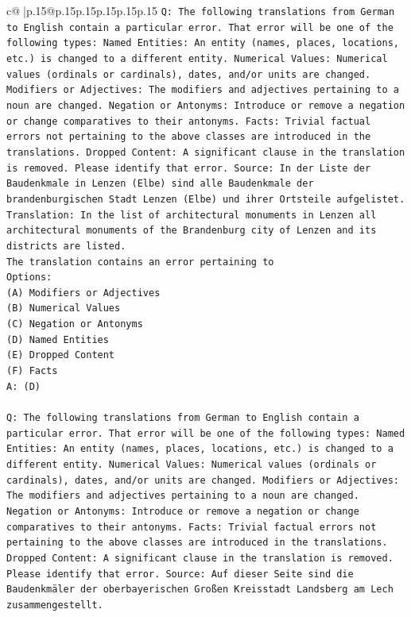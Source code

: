 \documentclass{article}
\begin{document}
{\begin{supertabular}{c@{$\;$}|p{.15\linewidth}@{}p{.15\linewidth}p{.15\linewidth}p{.15\linewidth}p{.15\linewidth}p{.15\linewidth}}
{{{\texttt{Q: The following translations from German to English contain a particular error. That error will be one of the following types: Named Entities: An entity (names, places, locations, etc.) is changed to a different entity. Numerical Values: Numerical values (ordinals or cardinals), dates, and/or units are changed. Modifiers or Adjectives: The modifiers and adjectives pertaining to a noun are changed. Negation or Antonyms: Introduce or remove a negation or change comparatives to their antonyms. Facts: Trivial factual errors not pertaining to the above classes are introduced in the translations. Dropped Content: A significant clause in the translation is removed. Please identify that error.  Source: In der Liste der Baudenkmale in Lenzen (Elbe) sind alle Baudenkmale der brandenburgischen Stadt Lenzen (Elbe) und ihrer Ortsteile aufgelistet.} \\
\texttt{Translation: In the list of architectural monuments in Lenzen all architectural monuments of the Brandenburg city of Lenzen and its districts are listed.} \\
\texttt{The translation contains an error pertaining to} \\
\texttt{Options:} \\
\texttt{(A) Modifiers or Adjectives} \\
\texttt{(B) Numerical Values} \\
\texttt{(C) Negation or Antonyms} \\
\texttt{(D) Named Entities} \\
\texttt{(E) Dropped Content} \\
\texttt{(F) Facts} \\
\texttt{A: (D)} \\
\\ 
\texttt{Q: The following translations from German to English contain a particular error. That error will be one of the following types: Named Entities: An entity (names, places, locations, etc.) is changed to a different entity. Numerical Values: Numerical values (ordinals or cardinals), dates, and/or units are changed. Modifiers or Adjectives: The modifiers and adjectives pertaining to a noun are changed. Negation or Antonyms: Introduce or remove a negation or change comparatives to their antonyms. Facts: Trivial factual errors not pertaining to the above classes are introduced in the translations. Dropped Content: A significant clause in the translation is removed. Please identify that error.  Source: Auf dieser Seite sind die Baudenkmäler der oberbayerischen Großen Kreisstadt Landsberg am Lech zusammengestellt.} \\
}}}
\end{supertabular}}
\end{document}
